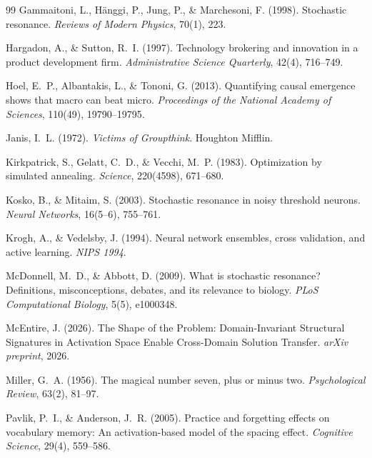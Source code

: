 \documentclass[12pt,letterpaper]{article}
\theoremstyle{definition}
\theoremstyle{remark}
\begin{document}
\begin{thebibliography}{99}
Gammaitoni, L., H\"{a}nggi, P., Jung, P., \& Marchesoni, F. (1998).
\newblock Stochastic resonance.
\newblock \emph{Reviews of Modern Physics}, 70(1), 223.

Hargadon, A., \& Sutton, R.~I. (1997).
\newblock Technology brokering and innovation in a product development firm.
\newblock \emph{Administrative Science Quarterly}, 42(4), 716--749.

Hoel, E.~P., Albantakis, L., \& Tononi, G. (2013).
\newblock Quantifying causal emergence shows that macro can beat micro.
\newblock \emph{Proceedings of the National Academy of Sciences}, 110(49), 19790--19795.

Janis, I.~L. (1972).
\newblock \emph{Victims of Groupthink}.
\newblock Houghton Mifflin.

Kirkpatrick, S., Gelatt, C.~D., \& Vecchi, M.~P. (1983).
\newblock Optimization by simulated annealing.
\newblock \emph{Science}, 220(4598), 671--680.

Kosko, B., \& Mitaim, S. (2003).
\newblock Stochastic resonance in noisy threshold neurons.
\newblock \emph{Neural Networks}, 16(5--6), 755--761.

Krogh, A., \& Vedelsby, J. (1994).
\newblock Neural network ensembles, cross validation, and active learning.
\newblock \emph{NIPS 1994}.

McDonnell, M.~D., \& Abbott, D. (2009).
\newblock What is stochastic resonance? Definitions, misconceptions, debates, and its relevance to biology.
\newblock \emph{PLoS Computational Biology}, 5(5), e1000348.

McEntire, J. (2026).
\newblock The Shape of the Problem: Domain-Invariant Structural Signatures in Activation Space Enable Cross-Domain Solution Transfer.
\newblock \emph{arXiv preprint}, 2026.

Miller, G.~A. (1956).
\newblock The magical number seven, plus or minus two.
\newblock \emph{Psychological Review}, 63(2), 81--97.

Pavlik, P.~I., \& Anderson, J.~R. (2005).
\newblock Practice and forgetting effects on vocabulary memory: An activation-based model of the spacing effect.
\newblock \emph{Cognitive Science}, 29(4), 559--586.


\end{thebibliography}
\end{document}
